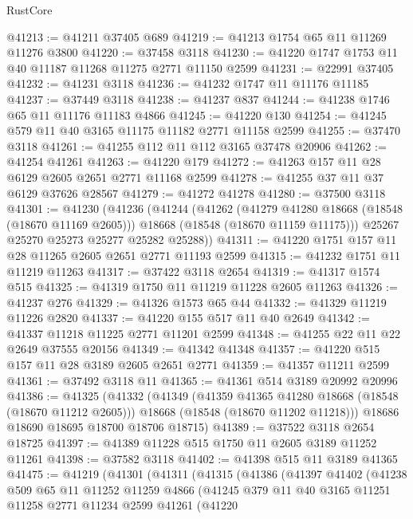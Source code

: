 \begin{lexlean}{RustCore}
\begin{coremodule}
@41213 := @41211 @37405 @689
@41219 := @41213 @1754 @65 @11 @11269 @11276 @3800
@41220 := @37458 @3118
@41230 := @41220 @1747 @1753 @11 @40 @11187 @11268 @11275 @2771 @11150 @2599
@41231 := @22991 @37405
@41232 := @41231 @3118
@41236 := @41232 @1747 @11 @11176 @11185
@41237 := @37449 @3118
@41238 := @41237 @837
@41244 := @41238 @1746 @65 @11 @11176 @11183 @4866
@41245 := @41220 @130
@41254 := @41245 @579 @11 @40 @3165 @11175 @11182 @2771 @11158 @2599
@41255 := @37470 @3118
@41261 := @41255 @112 @11 @112 @3165 @37478 @20906
@41262 := @41254 @41261
@41263 := @41220 @179
@41272 := @41263 @157 @11 @28 @6129 @2605 @2651 @2771 @11168 @2599
@41278 := @41255 @37 @11 @37 @6129 @37626 @28567
@41279 := @41272 @41278
@41280 := @37500 @3118
@41301 := @41230
    (@41236
      (@41244
        (@41262
          (@41279 @41280 @18668 (@18548 (@18670 @11169 @2605)))
          @18668
          (@18548 (@18670 @11159 @11175)))
        @25267
        @25270
        @25273
        @25277
        @25282
        @25288))
@41311 := @41220 @1751 @157 @11 @28 @11265 @2605 @2651 @2771 @11193 @2599
@41315 := @41232 @1751 @11 @11219 @11263
@41317 := @37422 @3118 @2654
@41319 := @41317 @1574 @515
@41325 := @41319 @1750 @11 @11219 @11228 @2605 @11263
@41326 := @41237 @276
@41329 := @41326 @1573 @65 @44
@41332 := @41329 @11219 @11226 @2820
@41337 := @41220 @155 @517 @11 @40 @2649
@41342 := @41337 @11218 @11225 @2771 @11201 @2599
@41348 := @41255 @22 @11 @22 @2649 @37555 @20156
@41349 := @41342 @41348
@41357 := @41220 @515 @157 @11 @28 @3189 @2605 @2651 @2771
@41359 := @41357 @11211 @2599
@41361 := @37492 @3118 @11
@41365 := @41361 @514 @3189 @20992 @20996
@41386 := @41325
    (@41332
      (@41349
        (@41359 @41365 @41280 @18668 (@18548 (@18670 @11212 @2605)))
        @18668
        (@18548 (@18670 @11202 @11218)))
      @18686
      @18690
      @18695
      @18700
      @18706
      @18715)
@41389 := @37522 @3118 @2654 @18725
@41397 := @41389 @11228 @515 @1750 @11 @2605 @3189 @11252 @11261
@41398 := @37582 @3118
@41402 := @41398 @515 @11 @3189 @41365
@41475 := @41219
    (@41301
      (@41311
        (@41315
          (@41386
            (@41397
              @41402
              (@41238
                @509
                @65
                @11
                @11252
                @11259
                @4866
                (@41245
                  @379
                  @11
                  @40
                  @3165
                  @11251
                  @11258
                  @2771
                  @11234
                  @2599
                  @41261
                  (@41220

\end{coremodule}
\end{lexlean}

